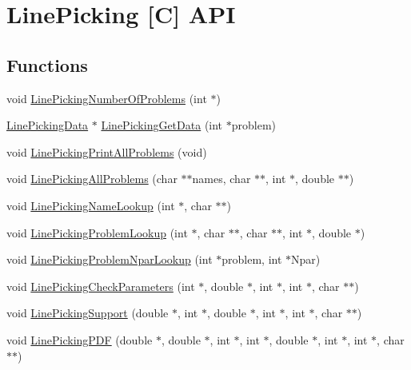 \hypertarget{group__api}{\section{Line\-Picking \mbox{[}C\mbox{]} A\-P\-I}
\label{group__api}
}
\subsection*{Functions}
\begin{DoxyCompactItemize}
\item 
void \hyperlink{group__api_gab0e3cb9eaef2a9f040f1135eee394f28}{Line\-Picking\-Number\-Of\-Problems} (int $\ast$)
\item 
\hyperlink{struct_line_picking_data}{Line\-Picking\-Data} $\ast$ \hyperlink{group__api_gafc38ba0fac3fc19f94ed6278b0d77f0f}{Line\-Picking\-Get\-Data} (int $\ast$problem)
\item 
void \hyperlink{group__api_ga1a1c27d3c46da382a0443f810628a8ac}{Line\-Picking\-Print\-All\-Problems} (void)
\item 
void \hyperlink{group__api_gadb58de53bac5d2fe684019ce77be9896}{Line\-Picking\-All\-Problems} (char $\ast$$\ast$names, char $\ast$$\ast$, int $\ast$, double $\ast$$\ast$)
\item 
void \hyperlink{group__api_ga17699721a1826bc3c2a2c3d80dff6f64}{Line\-Picking\-Name\-Lookup} (int $\ast$, char $\ast$$\ast$)
\item 
void \hyperlink{group__api_gaab56d0ac9177e8ec90b87d0927220283}{Line\-Picking\-Problem\-Lookup} (int $\ast$, char $\ast$$\ast$, char $\ast$$\ast$, int $\ast$, double $\ast$)
\item 
void \hyperlink{group__api_ga5ac22934d32edfdf42075bff533e5ccb}{Line\-Picking\-Problem\-Npar\-Lookup} (int $\ast$problem, int $\ast$Npar)
\item 
void \hyperlink{group__api_gac55d1d166b33c8906ceccbb37010ddb0}{Line\-Picking\-Check\-Parameters} (int $\ast$, double $\ast$, int $\ast$, int $\ast$, char $\ast$$\ast$)
\item 
void \hyperlink{group__api_ga0aec0b2f87903f4bf4ad3011a99b3446}{Line\-Picking\-Support} (double $\ast$, int $\ast$, double $\ast$, int $\ast$, int $\ast$, char $\ast$$\ast$)
\item 
void \hyperlink{group__api_ga8feba9835984bd74f3d919f51389e573}{Line\-Picking\-P\-D\-F} (double $\ast$, double $\ast$, int $\ast$, int $\ast$, double $\ast$, int $\ast$, int $\ast$, char $\ast$$\ast$)
\item 
$$
\end{DoxyCompactItemize}
